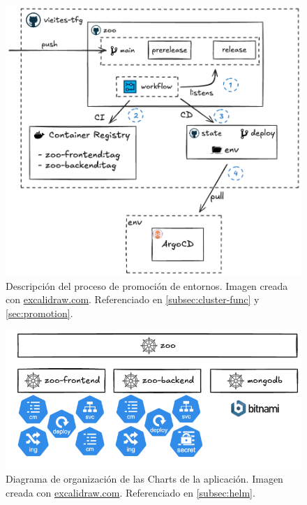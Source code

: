 \begin{figure}[h]
  \centerline{\includegraphics[width=13cm]{figuras/promotion}}
  \caption{Descripción del proceso de promoción de entornos. Imagen creada con \href{https://excalidraw.com}{excalidraw.com}. Referenciado en \ref{subsec:cluster-func} y \ref{sec:promotion}.}
  \label{fig:promotion}
\end{figure}

\begin{figure}[h]
  \centerline{\includegraphics[width=13cm]{figuras/helm-repository}}
  \caption{Diagrama de organización de las Charts de la aplicación. Imagen creada con \href{https://excalidraw.com}{excalidraw.com}. Referenciado en \ref{subsec:helm}.}
  \label{fig:helm-repository}
\end{figure}


